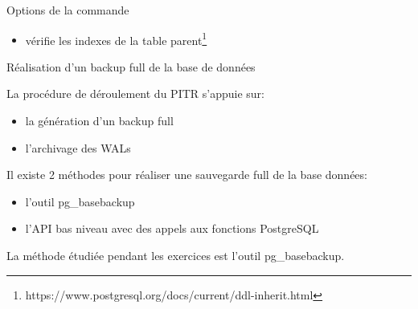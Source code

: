 
\begin{frame}{Options de la commande }

\begin{itemize}
   \item {} vérifie les indexes de la table parent\footnote{https://www.postgresql.org/docs/current/ddl-inherit.html}
\end{itemize}

\end{frame}




\begin{frame}{Réalisation d'un backup full de la base de données}

La procédure de déroulement du PITR s'appuie sur:
\begin{itemize}
   \item la génération d'un backup full
   \item l'archivage des WALs
\end{itemize}


Il existe 2 méthodes pour réaliser une sauvegarde full de la base données:
\begin{itemize}
   \item l'outil \textsf{pg\_basebackup}
   \item l'API bas niveau avec des appels aux fonctions PostgreSQL
\end{itemize}

La méthode étudiée pendant les exercices est l'outil \textsf{pg\_basebackup}.

\end{frame}



